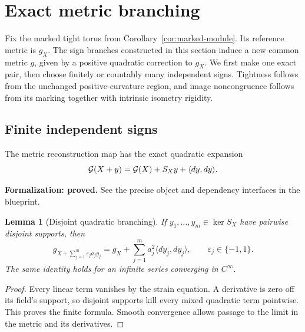\documentclass[11pt]{amsart}
\newtheorem{lemma}[theorem]{Lemma}
\theoremstyle{definition}
\theoremstyle{remark}
\numberwithin{equation}{section}
\begin{document}
\section{Exact metric branching}\label{sec:reconstruction}
Fix the marked tight torus from Corollary~\ref{cor:marked-module}.
Its reference metric is $g_X$. The sign branches constructed in this
section induce a new common metric $g$, given by a positive quadratic
correction to $g_X$. We first make one exact pair, then choose finitely
or countably many independent signs. Tightness follows from the
unchanged positive-curvature region, and image noncongruence follows
from its marking together with intrinsic isometry rigidity.

\subsection{Finite independent signs}
The metric reconstruction map has the exact quadratic expansion
\begin{equation}\label{eq:metricquad}
 \mathcal G(X+y)=\mathcal G(X)+S_Xy+\langle dy,dy\rangle.
\end{equation}
\par\noindent\textbf{Formalization: proved.} See the precise object and dependency interfaces in the blueprint.\par
\begin{lemma}[Disjoint quadratic branching]\label{thm:branch}
If $y_1,\ldots,y_m\in\ker S_X$ have pairwise disjoint supports, then
\begin{equation}\label{eq:abstractsign}
 g_{X+\sum_{j=1}^m\varepsilon_j a_jy_j}
 =g_X+\sum_{j=1}^m a_j^2\langle dy_j,dy_j\rangle,
 \qquad\varepsilon_j\in\{-1,1\}.
\end{equation}
The same identity holds for an infinite series converging in $C^\infty$.
\end{lemma}
\begin{proof}
Every linear term vanishes by the strain equation. A derivative is zero
off its field's support, so disjoint supports kill every mixed quadratic
term pointwise. This proves the finite formula. Smooth convergence allows
passage to the limit in the metric and its derivatives.
\end{proof}
\end{document}
